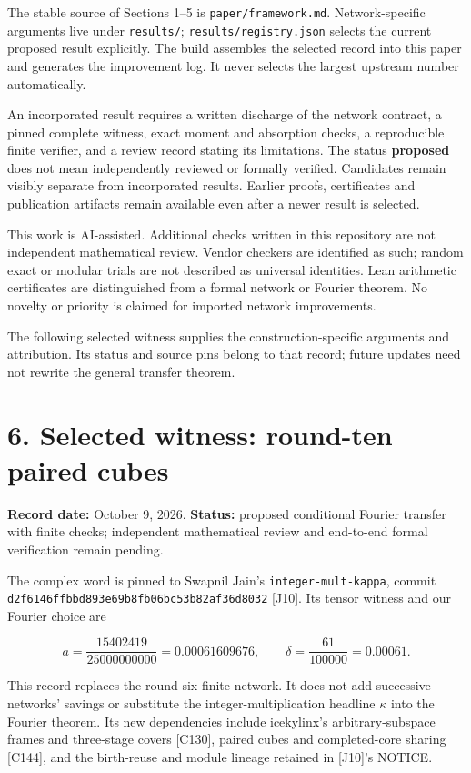 \documentclass[
  11pt,
]{article}
\begin{document}
The stable source of Sections 1--5 is \texttt{paper/\allowbreak{}framework.md}.
Network-specific arguments live under \texttt{results/\allowbreak{}};
\texttt{results/\allowbreak{}registry.json} selects the current proposed result
explicitly. The build assembles the selected record into this paper and
generates the improvement log. It never selects the largest upstream
number automatically.

An incorporated result requires a written discharge of the network
contract, a pinned complete witness, exact moment and absorption checks,
a reproducible finite verifier, and a review record stating its
limitations. The status \textbf{proposed} does not mean independently
reviewed or formally verified. Candidates remain visibly separate from
incorporated results. Earlier proofs, certificates and publication
artifacts remain available even after a newer result is selected.

This work is AI-assisted. Additional checks written in this repository
are not independent mathematical review. Vendor checkers are identified
as such; random exact or modular trials are not described as universal
identities. Lean arithmetic certificates are distinguished from a formal
network or Fourier theorem. No novelty or priority is claimed for
imported network improvements.

The following selected witness supplies the construction-specific
arguments and attribution. Its status and source pins belong to that
record; future updates need not rewrite the general transfer theorem.

\section{6. Selected witness: round-ten paired
cubes}\label{selected-witness-round-ten-paired-cubes}

\textbf{Record date:} October 9, 2026. \textbf{Status:} proposed
conditional Fourier transfer with finite checks; independent
mathematical review and end-to-end formal verification remain pending.

The complex word is pinned to Swapnil Jain's
\texttt{integer-mult-kappa}, commit
\texttt{d2f6146ffb\allowbreak{}bd893e69b8\allowbreak{}fb06bc53b8\allowbreak{}2af36d8032} {[}J10{]}. Its tensor
witness and our Fourier choice are

\[
a=\frac{15402419}{25000000000}=0.00061609676,
\qquad \delta=\frac{61}{100000}=0.00061.
\tag{6.1}
\]

This record replaces the round-six finite network. It does not add
successive networks' savings or substitute the integer-multiplication
headline \(\kappa\) into the Fourier theorem. Its new dependencies
include icekylinx's arbitrary-subspace frames and three-stage covers
{[}C130{]}, paired cubes and completed-core sharing {[}C144{]}, and the
birth-reuse and module lineage retained in {[}J10{]}'s NOTICE.
\end{document}
